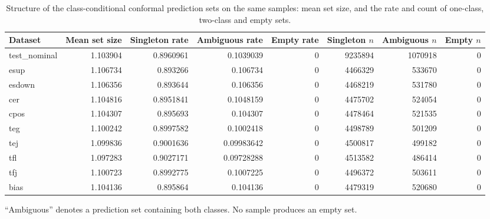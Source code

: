 \begin{table}[!ht]
\centering
\footnotesize
\setlength{\tabcolsep}{4pt}
\caption{Structure of the class-conditional conformal prediction sets on the same samples: mean set size, and the rate and count of one-class, two-class and empty sets.}
\label{tab:supp-conformal-sets}
\begin{tabular}{l r rrr rrr}
\toprule
Dataset & Mean set size & Singleton rate & Ambiguous rate & Empty rate & Singleton $n$ & Ambiguous $n$ & Empty $n$ \\
\midrule
test\_nominal & 1.103904 & 0.8960961 & 0.1039039 & 0 & 9235894 & 1070918 & 0 \\
esup & 1.106734 & 0.893266 & 0.106734 & 0 & 4466329 & 533670 & 0 \\
esdown & 1.106356 & 0.893644 & 0.106356 & 0 & 4468219 & 531780 & 0 \\
cer & 1.104816 & 0.8951841 & 0.1048159 & 0 & 4475702 & 524054 & 0 \\
cpos & 1.104307 & 0.895693 & 0.104307 & 0 & 4478464 & 521535 & 0 \\
teg & 1.100242 & 0.8997582 & 0.1002418 & 0 & 4498789 & 501209 & 0 \\
tej & 1.099836 & 0.9001636 & 0.09983642 & 0 & 4500817 & 499182 & 0 \\
tfl & 1.097283 & 0.9027171 & 0.09728288 & 0 & 4513582 & 486414 & 0 \\
tfj & 1.100723 & 0.8992775 & 0.1007225 & 0 & 4496372 & 503611 & 0 \\
bias & 1.104136 & 0.895864 & 0.104136 & 0 & 4479319 & 520680 & 0 \\
\bottomrule
\end{tabular}
\par\vspace{4pt}
\begin{minipage}{\textwidth}\footnotesize ``Ambiguous'' denotes a prediction set containing both classes. No sample produces an empty set.\end{minipage}
\end{table}
